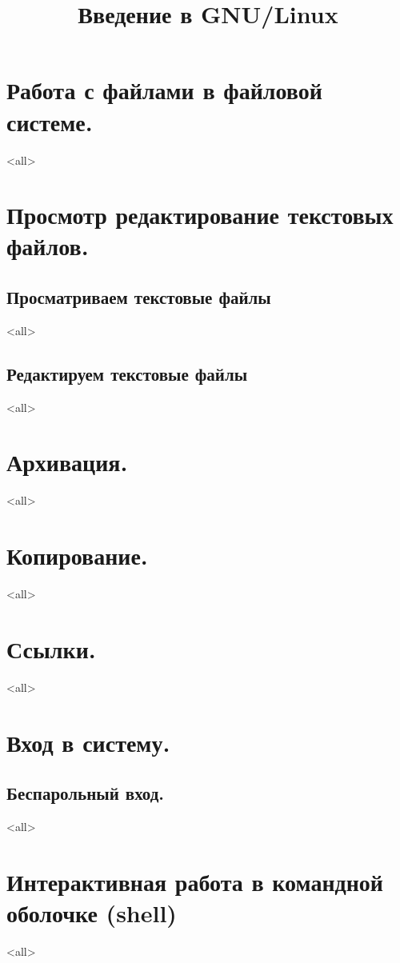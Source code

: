 

\title{Введение в GNU/Linux}




\begin{frame}
	\frametitle{}
	\titlepage
	\vspace{-0.5cm}
	\begin{center}
	\end{center}
\end{frame}


\begin{frame}
	\tableofcontents
	[hideallsubsections]
\end{frame}


\section{Работа с файлами в файловой системе.}
\mode<all>{}
\section{Просмотр редактирование текстовых файлов.}
\subsection{Просматриваем текстовые файлы}
\mode<all>{}
\subsection{Редактируем текстовые файлы}
\mode<all>{}
\section{Архивация.}
\mode<all>{}
\section{Копирование.}
\mode<all>{}
\section{Ссылки.}
\mode<all>{}
\section{Вход в систему.}
\subsection{Беспарольный вход.}
\mode<all>{}
\section{Интерактивная работа в командной оболочке (shell)}
\mode<all>{}

\bye
